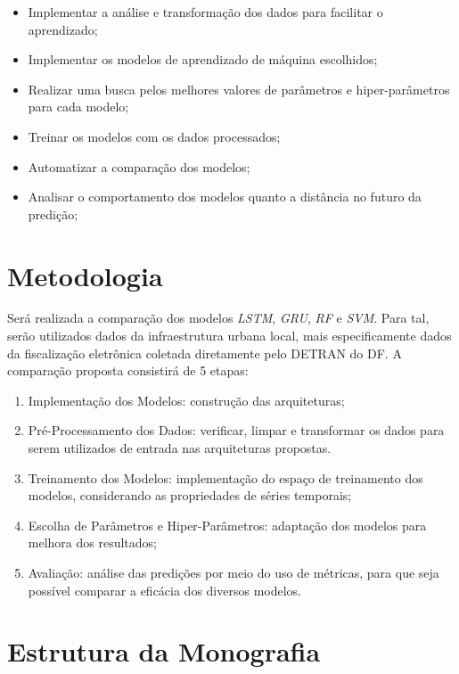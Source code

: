 \begin{itemize}
    \item Implementar a análise e transformação dos dados para facilitar o aprendizado;
    \item Implementar os modelos de aprendizado de máquina escolhidos; 
    \item Realizar uma busca pelos melhores valores de parâmetros e hiper-parâmetros para cada modelo;
    \item Treinar os modelos com os dados processados;
    \item Automatizar a comparação dos modelos;
    \item Analisar o comportamento dos modelos quanto a distância no futuro da predição;
\end{itemize}

\section{Metodologia}

Será realizada a comparação dos modelos  \textit{\acrshort{LSTM}}, \textit{\acrshort{GRU}}, \textit{\acrshort{RF}} e \textit{\acrshort{SVM}}. Para tal, serão utilizados dados da infraestrutura urbana local, mais especificamente dados da fiscalização eletrônica coletada diretamente pelo \acrfull{DETRAN} do \acrfull{DF}. A comparação proposta consistirá de 5 etapas:

\begin{enumerate}
    \item Implementação dos Modelos: construção das arquiteturas;
    \item Pré-Processamento dos Dados: verificar, limpar e transformar os dados para serem utilizados de entrada nas arquiteturas propostas.
    \item Treinamento dos Modelos: implementação do espaço de treinamento dos modelos, considerando as propriedades de séries temporais;
    \item Escolha de Parâmetros e Hiper-Parâmetros: adaptação dos modelos para melhora dos resultados;
    \item Avaliação: análise das predições por meio do uso de métricas, para que seja possível comparar a eficácia dos diversos modelos.
\end{enumerate}

\section{Estrutura da Monografia}


